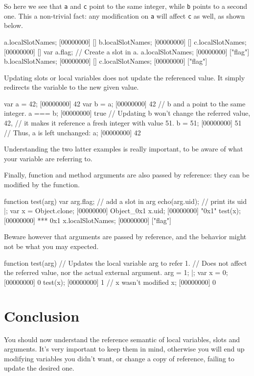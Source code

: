 So here we see that \lstinline|a| and \lstinline|c| point to the same
integer, while \lstinline|b| points to a second one. This a
non-trivial fact: any modification on \lstinline|a| will affect
\lstinline|c| as well, as shown below.

\begin{urbiscript}
a.localSlotNames;
[00000000] []
b.localSlotNames;
[00000000] []
c.localSlotNames;
[00000000] []
var a.flag; // Create a slot in a.
a.localSlotNames;
[00000000] ["flag"]
b.localSlotNames;
[00000000] []
c.localSlotNames;
[00000000] ["flag"]
\end{urbiscript}

Updating slots or local variables does not update the referenced
value. It simply redirects the variable to the new given value.

\begin{urbiscript}[firstnumber=1]
var a = 42;
[00000000] 42
var b = a;
[00000000] 42
// b and a point to the same integer.
a === b;
[00000000] true
// Updating b won't change the referred value, 42,
// it makes it reference a fresh integer with value 51.
b = 51;
[00000000] 51
// Thus, a is left unchanged:
a;
[00000000] 42
\end{urbiscript}

Understanding the two latter examples is really important, to be aware
of what your variable are referring to.

Finally, function and method arguments are also passed by reference:
they can be modified by the function.

\begin{urbiscript}[firstnumber=1]
function test(arg)
{
  var arg.flag;  // add a slot in arg
  echo(arg.uid); // print its uid
} |;
var x = Object.clone;
[00000000] Object_0x1
x.uid;
[00000000] "0x1"
test(x);
[00000000] *** 0x1
x.localSlotNames;
[00000000] ["flag"]
\end{urbiscript}

Beware however that arguments are passed by reference, and the
behavior might not be what you may expected.

\begin{urbiscript}[firstnumber=1]
function test(arg)
{
  // Updates the local variable arg to refer 1.
  // Does not affect the referred value, nor the actual external argument.
  arg = 1;
} |;
var x = 0;
[00000000] 0
test(x);
[00000000] 1
// x wasn't modified
x;
[00000000] 0
\end{urbiscript}

\section{Conclusion}

You should now understand the reference semantic of local variables,
slots and arguments. It's very important to keep them in mind,
otherwise you will end up modifying variables you didn't want, or
change a copy of reference, failing to update the desired one.

